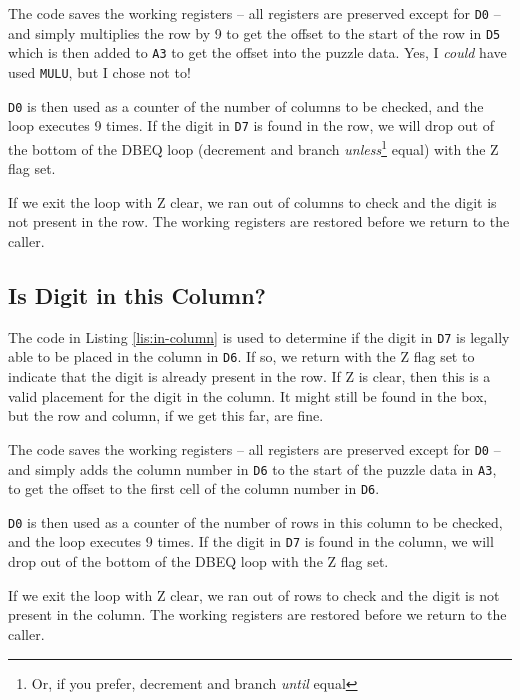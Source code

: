 The code saves the working registers -- all registers are preserved
except for \texttt{D0} -- and simply multiplies the row by 9 to get
the offset to the start of the row in \texttt{D5} which is then added
to \texttt{A3} to get the offset into the puzzle data. Yes, I \emph{could}
have used \texttt{MULU}, but I chose not to!

\texttt{D0} is then used as a counter of the number of columns to
be checked, and the loop executes 9 times. If the digit in \texttt{D7}
is found in the row, we will drop out of the bottom of the DBEQ loop
(decrement and branch \emph{unless}\footnote{Or, if you prefer, decrement and branch \emph{until} equal}
equal) with the Z flag set.

If we exit the loop with Z clear, we ran out of columns to check and
the digit is not present in the row. The working registers are restored
before we return to the caller.

\subsection{Is Digit in this Column?}

The code in Listing \ref{lis:in-column} is used to determine if the
digit in \texttt{D7} is legally able to be placed in the column in
\texttt{D6}. If so, we return with the Z flag set to indicate that
the digit is already present in the row. If Z is clear, then this
is a valid placement for the digit in the column. It might still be
found in the box, but the row and column, if we get this far, are
fine.



The code saves the working registers -- all registers are preserved
except for \texttt{D0} -- and simply adds the column number in \texttt{D6}
to the start of the puzzle data in \texttt{A3}, to get the offset
to the first cell of the column number in \texttt{D6}. 

\texttt{D0} is then used as a counter of the number of rows in this
column to be checked, and the loop executes 9 times. If the digit
in \texttt{D7} is found in the column, we will drop out of the bottom
of the DBEQ loop with the Z flag set.

If we exit the loop with Z clear, we ran out of rows to check and
the digit is not present in the column. The working registers are
restored before we return to the caller.

